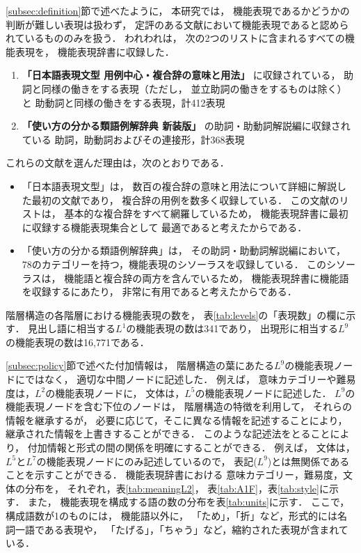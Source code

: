 \documentclass[japanese]{jnlp_1.3e}
\begin{document}
\ref{subsec:definition}節で述べたように，
本研究では，
機能表現であるかどうかの判断が難しい表現は扱わず，
定評のある文献において機能表現であると認められているもののみを扱う．
われわれは，
次の2つのリストに含まれるすべての機能表現を，
機能表現辞書に収録した．
\begin{enumerate}
 \item {\bf 「日本語表現文型 用例中心・複合辞の意味と用法」}
       に収録されている，
       助詞と同様の働きをする表現（ただし，
       並立助詞の働きをするものは除く）と
       助動詞と同様の働きをする表現，計412表現
 \item {\bf 「使い方の分かる類語例解辞典 新装版」}
       の助詞・助動詞解説編に収録されている
       助詞，助動詞およびその連接形，計368表現
\end{enumerate}
これらの文献を選んだ理由は，次のとおりである．
\begin{itemize}
\item 「日本語表現文型」は，
      数百の複合辞の意味と用法について詳細に解説した最初の文献であり，
      複合辞の用例を数多く収録している．
      この文献のリストは，
      基本的な複合辞をすべて網羅しているため，
      機能表現辞書に最初に収録する機能表現集合として
      最適であると考えたからである．
\item 「使い方の分かる類語例解辞典」は，
      その助詞・助動詞解説編において，
      78のカテゴリーを持つ，機能表現のシソーラスを収録している．
      このシソーラスは，
      機能語と複合辞の両方を含んでいるため，
      機能表現辞書に機能語を収録するにあたり，
      非常に有用であると考えたからである．
\end{itemize}

階層構造の各階層における機能表現の数を，
表\ref{tab:levels}の「表現数」の欄に示す．
見出し語に相当する$L^1$の機能表現の数は341であり，
出現形に相当する$L^9$の機能表現の数は16,771である．

\ref{subsec:policy}節で述べた付加情報は，
階層構造の葉にあたる$L^9$の機能表現ノードにではなく，
適切な中間ノードに記述した．
例えば，
意味カテゴリーや難易度は，$L^2$の機能表現ノードに，
文体は，$L^5$の機能表現ノードに記述した．
$L^9$の機能表現ノードを含む下位のノードは，
階層構造の特徴を利用して，
それらの情報を継承するが，
必要に応じて，そこに異なる情報を記述することにより，
継承された情報を上書きすることができる．
このような記述法をとることにより，
付加情報と形式の間の関係を明確にすることができる．
例えば，
文体は，$L^5$と$L^7$の機能表現ノードにのみ記述しているので，
表記($L^9$)とは無関係であることを示すことができる．
機能表現辞書における
意味カテゴリー，難易度，文体の分布を，
それぞれ，表\ref{tab:meaningL2}，
表\ref{tab:A1F}，表\ref{tab:style}に示す．
また，
機能表現を構成する語の数の分布を表\ref{tab:units}に示す．
ここで，構成語数が1のものには，
機能語以外に，
「ため」，「折」など，形式的には名詞一語である表現や，
「たげる」，「ちゃう」など，縮約された表現が含まれている．
\end{document}
